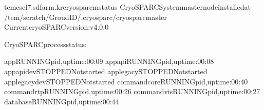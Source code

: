 \documentclass[a4paper,10pt,english]{sphinxmanual}
\begin{document}
\begin{sphinxVerbatim}[commandchars=\\\{\}]
tem\PYGZhy{}cs\PYGZhy{}el7.sdfarm.kr\PYGZdl{}\PYGZgt{}cryosparcmstatus
\PYGZhy{}\PYGZhy{}\PYGZhy{}\PYGZhy{}\PYGZhy{}\PYGZhy{}\PYGZhy{}\PYGZhy{}\PYGZhy{}\PYGZhy{}\PYGZhy{}\PYGZhy{}\PYGZhy{}\PYGZhy{}\PYGZhy{}\PYGZhy{}\PYGZhy{}\PYGZhy{}\PYGZhy{}\PYGZhy{}\PYGZhy{}\PYGZhy{}\PYGZhy{}\PYGZhy{}\PYGZhy{}\PYGZhy{}\PYGZhy{}\PYGZhy{}\PYGZhy{}\PYGZhy{}\PYGZhy{}\PYGZhy{}\PYGZhy{}\PYGZhy{}\PYGZhy{}\PYGZhy{}\PYGZhy{}\PYGZhy{}\PYGZhy{}\PYGZhy{}\PYGZhy{}\PYGZhy{}\PYGZhy{}\PYGZhy{}\PYGZhy{}\PYGZhy{}\PYGZhy{}\PYGZhy{}\PYGZhy{}\PYGZhy{}\PYGZhy{}\PYGZhy{}\PYGZhy{}\PYGZhy{}\PYGZhy{}\PYGZhy{}\PYGZhy{}\PYGZhy{}\PYGZhy{}\PYGZhy{}\PYGZhy{}\PYGZhy{}\PYGZhy{}\PYGZhy{}\PYGZhy{}\PYGZhy{}\PYGZhy{}\PYGZhy{}\PYGZhy{}\PYGZhy{}\PYGZhy{}\PYGZhy{}\PYGZhy{}\PYGZhy{}\PYGZhy{}\PYGZhy{}
CryoSPARCSystemmasternodeinstalledat
/tem/scratch/\PYGZlt{}GroudID\PYGZgt{}/.cryosparc/cryosparc\PYGZus{}master
CurrentcryoSPARCversion:v4.0.0
\PYGZhy{}\PYGZhy{}\PYGZhy{}\PYGZhy{}\PYGZhy{}\PYGZhy{}\PYGZhy{}\PYGZhy{}\PYGZhy{}\PYGZhy{}\PYGZhy{}\PYGZhy{}\PYGZhy{}\PYGZhy{}\PYGZhy{}\PYGZhy{}\PYGZhy{}\PYGZhy{}\PYGZhy{}\PYGZhy{}\PYGZhy{}\PYGZhy{}\PYGZhy{}\PYGZhy{}\PYGZhy{}\PYGZhy{}\PYGZhy{}\PYGZhy{}\PYGZhy{}\PYGZhy{}\PYGZhy{}\PYGZhy{}\PYGZhy{}\PYGZhy{}\PYGZhy{}\PYGZhy{}\PYGZhy{}\PYGZhy{}\PYGZhy{}\PYGZhy{}\PYGZhy{}\PYGZhy{}\PYGZhy{}\PYGZhy{}\PYGZhy{}\PYGZhy{}\PYGZhy{}\PYGZhy{}\PYGZhy{}\PYGZhy{}\PYGZhy{}\PYGZhy{}\PYGZhy{}\PYGZhy{}\PYGZhy{}\PYGZhy{}\PYGZhy{}\PYGZhy{}\PYGZhy{}\PYGZhy{}\PYGZhy{}\PYGZhy{}\PYGZhy{}\PYGZhy{}\PYGZhy{}\PYGZhy{}\PYGZhy{}\PYGZhy{}\PYGZhy{}\PYGZhy{}\PYGZhy{}\PYGZhy{}\PYGZhy{}\PYGZhy{}\PYGZhy{}\PYGZhy{}

CryoSPARCprocessstatus:

appRUNNINGpid,uptime:00:09
app\PYGZus{}apiRUNNINGpid,uptime:00:08
app\PYGZus{}api\PYGZus{}devSTOPPEDNotstarted
app\PYGZus{}legacySTOPPEDNotstarted
app\PYGZus{}legacy\PYGZus{}devSTOPPEDNotstarted
command\PYGZus{}coreRUNNINGpid,uptime:00:40
command\PYGZus{}rtpRUNNINGpid,uptime:00:26
command\PYGZus{}visRUNNINGpid,uptime:00:27
databaseRUNNINGpid,uptime:00:44


\end{sphinxVerbatim}
\end{document}
